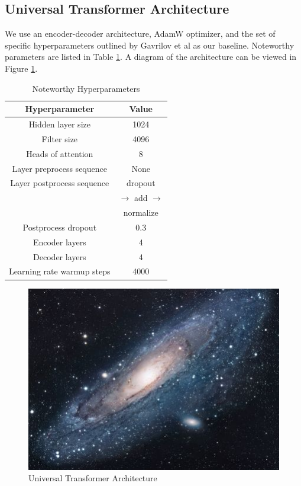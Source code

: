 \documentclass[11pt]{article}
\begin{document}
\subsection{Universal Transformer Architecture}
We use an encoder-decoder architecture, AdamW optimizer, and the set of specific hyperparameters outlined by Gavrilov et al \cite{DBLP:journals/corr/abs-1901-07786} as our baseline. Noteworthy parameters are listed in Table \ref{table:1}. A diagram of the architecture can be viewed in Figure \ref{figure:1}.

\begin{table}[h!]
\centering
\begin{tabular}{|c | c|} 
 \hline
 Hyperparameter & Value \\ [0.5ex] 
 \hline
 Hidden layer size & 1024 \\ 
 Filter size & 4096 \\
 Heads of attention & 8 \\
 Layer preprocess sequence & None \\
 Layer postprocess sequence & dropout \\
 & $\rightarrow$ add $\rightarrow$ \\
 & normalize \\
 Postprocess dropout & 0.3 \\
 Encoder layers & 4 \\
 Decoder layers & 4 \\
 Learning rate warmup steps & 4000 \\ [1ex]
 \hline
\end{tabular}
\caption{Noteworthy Hyperparameters}
\label{table:1}
\end{table}

\begin{figure}[h!]
\centering
\includegraphics[scale=1.7]{universe}
\caption{Universal Transformer Architecture}
\label{figure:1}
\end{figure}
\end{document}
